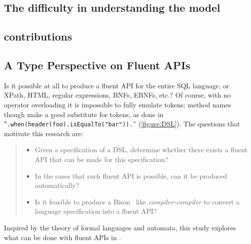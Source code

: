 \subsection{The difficulty in understanding the \Java model}

\subsection{contributions}

\subsection{A Type Perspective on Fluent APIs}
Is it possible at all to produce a fluent API for the entire SQL language, or
XPath, HTML, regular expressions, BNFs, EBNFs, etc.? Of course, with no
operator overloading it is impossible to fully emulate tokens; method names
though make a good substitute for tokens, as done in
‟\lstinline{.when(header(foo).isEqualTo("bar")).}” (\cref{figure:DSL}). The
questions that motivate this research are:

\begin{quote}
  \begin{itemize}
    \item Given a specification of a DSL, determine whether there exists
          a fluent API that can be made for this specification?
    \item In the cases that such fluent API is possible,
          can it be produced automatically?
    \item Is it feasible to produce a Bison~\cite{Bison:manual}
          like \emph{compiler-compiler}
          to convert a language specification into a fluent API?
  \end{itemize}
\end{quote}

Inspired by the theory of formal languages and automata,
this study explores what can be done with fluent APIs in \Java.

